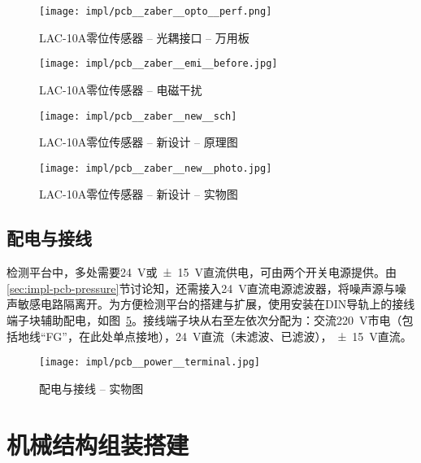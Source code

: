 \begin{figure}[tbhp]
\centering
\texttt{[image: impl/pcb\_\_zaber\_\_opto\_\_perf.png]}
\caption{LAC-10A零位传感器 -- 光耦接口 -- 万用板}
\label{fig:impl-pcb-zaber-opto-perf}
\end{figure}

\begin{figure}[p]
\centering
\texttt{[image: impl/pcb\_\_zaber\_\_emi\_\_before.jpg]}
\caption{LAC-10A零位传感器 -- 电磁干扰}
\label{fig:impl-pcb-zaber-emi-before}
\end{figure}

\begin{figure}[p]
\centering
\texttt{[image: impl/pcb\_\_zaber\_\_new\_\_sch]}
\caption{LAC-10A零位传感器 -- 新设计 -- 原理图}
\label{fig:impl-pcb-zaber-new-sch}
\end{figure}

\begin{figure}[p]
\centering
\texttt{[image: impl/pcb\_\_zaber\_\_new\_\_photo.jpg]}
\caption{LAC-10A零位传感器 -- 新设计 -- 实物图}
\label{fig:impl-pcb-zaber-new-photo}
\end{figure}


\clearpage


\subsection{配电与接线}\label{sec:impl-pcb-power}

检测平台中，多处需要\SI{+24}{\V}或\SI{\pm 15}{\V}直流供电，可由两个开关电源提供。由\ref{sec:impl-pcb-pressure}节讨论知，还需接入\SI{+24}{\V}直流电源滤波器，将噪声源与噪声敏感电路隔离开。为方便检测平台的搭建与扩展，使用安装在DIN导轨上的接线端子块辅助配电，如图~\ref{fig:impl-pcb-power-terminal}。接线端子块从右至左依次分配为：交流\SI{220}{\V}市电（包括地线``FG''，在此处单点接地），\SI{+24}{\V}直流（未滤波、已滤波），\SI{\pm 15}{\V}直流。

\begin{figure}[h]
\centering
\texttt{[image: impl/pcb\_\_power\_\_terminal.jpg]}
\caption{配电与接线 -- 实物图}
\label{fig:impl-pcb-power-terminal}
\end{figure}



\clearpage



\section{机械结构组装搭建}\label{sec:impl-mech}

